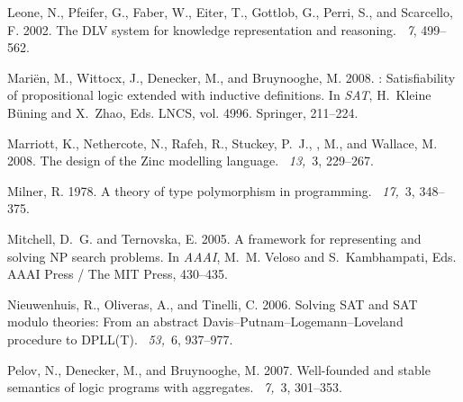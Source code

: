 \documentclass{tlp}
\renewcommand{\|}{\ensuremath{\,|\,}}
\renewcommand{\|}{\,|\,}
\begin{document}
\begin{thebibliography}{}
{\sc Leone, N.}, {\sc Pfeifer, G.}, {\sc Faber, W.}, {\sc Eiter, T.}, {\sc
  Gottlob, G.}, {\sc Perri, S.}, {\sc and} {\sc Scarcello, F.} 2002.
\newblock The {DLV} system for knowledge representation and reasoning.
~{\em 7}, 499--562.

{\sc Mari{\"e}n, M.}, {\sc Wittocx, J.}, {\sc Denecker, M.}, {\sc and} {\sc
  Bruynooghe, M.} 2008.
: Satisfiability of propositional logic extended with
  inductive definitions.
\newblock In {\em SAT}, {H.~{Kleine B{\"u}ning}} {and} {X.~Zhao}, Eds. LNCS,
  vol. 4996. Springer, 211--224.

{\sc Marriott, K.}, {\sc Nethercote, N.}, {\sc Rafeh, R.}, {\sc Stuckey,
  P.~J.}, {, M.}, {\sc and} {\sc Wallace, M.} 2008.
\newblock The design of the {Zinc} modelling language.
~{\em 13,\/}~3, 229--267.

{\sc Milner, R.} 1978.
\newblock A theory of type polymorphism in programming.
~{\em 17,\/}~3, 348--375.

{\sc Mitchell, D.~G.} {\sc and} {\sc Ternovska, E.} 2005.
\newblock A framework for representing and solving {NP} search problems.
\newblock In {\em AAAI}, {M.~M. Veloso} {and} {S.~Kambhampati}, Eds. AAAI Press
  / The MIT Press, 430--435.

{\sc Nieuwenhuis, R.}, {\sc Oliveras, A.}, {\sc and} {\sc Tinelli, C.} 2006.
\newblock Solving {SAT} and {SAT} modulo theories: From an abstract
  {D}avis--{P}utnam--{L}ogemann--{L}oveland procedure to {DPLL(T)}.
~{\em 53,\/}~6, 937--977.

{\sc Pelov, N.}, {\sc Denecker, M.}, {\sc and} {\sc Bruynooghe, M.} 2007.
\newblock Well-founded and stable semantics of logic programs with aggregates.
~{\em 7,\/}~3,
  301--353.


\end{thebibliography}
\end{document}

